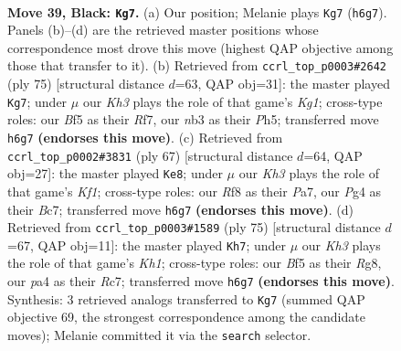 \documentclass[11pt]{article}
\begin{document}
\clearpage

\begin{figure}[p]\centering
\begin{subfigure}{0.46\textwidth}\centering
\resizebox{\linewidth}{!}{%
\newchessgame
\chessboard[
  setfen={5r2/4r3/1p5k/p1p1nb2/P5p1/1NP1R1P1/K6P/5BNR b - - 0 39},
  showmover=false,
  pgfstyle=straightmove, color=movearrow, markmove={h6-g7}
]}
\caption{}
\end{subfigure}\hfill
\begin{subfigure}{0.46\textwidth}\centering
\resizebox{\linewidth}{!}{%
\newchessgame
\chessboard[
  setfen={6k1/5r2/r1nR4/4p2p/4Pp2/5Pp1/2P3PP/2NR3K b - - 5 38},
  showmover=false,
  pgfstyle=straightmove, color=movearrow, markmove={g8-g7}
]}
\caption{}
\end{subfigure}
\\[4pt]
\begin{subfigure}{0.46\textwidth}\centering
\resizebox{\linewidth}{!}{%
\newchessgame
\chessboard[
  setfen={5k2/p1b2pp1/3r2p1/1p1nN3/3R3P/6P1/PP1B1P2/5K2 b - - 9 34},
  showmover=false,
  pgfstyle=straightmove, color=movearrow, markmove={f8-e8}
]}
\caption{}
\end{subfigure}\hfill
\begin{subfigure}{0.46\textwidth}\centering
\resizebox{\linewidth}{!}{%
\newchessgame
\chessboard[
  setfen={6rk/2r2pp1/3N1n1p/p4P2/Pp6/1P6/2PR3P/1K4R1 b - - 6 38},
  showmover=false,
  pgfstyle=straightmove, color=movearrow, markmove={h8-h7}
]}
\caption{}
\end{subfigure}
\caption{\textbf{Move 39, Black: \texttt{Kg7}.} (a) Our position; Melanie plays \texttt{Kg7} (\texttt{h6g7}). Panels (b)--(d) are the retrieved master positions whose correspondence most drove this move (highest QAP objective among those that transfer to it). (b) Retrieved from \texttt{ccrl\_top\_p0003\#2642} (ply 75) [structural distance $d$=63, QAP obj=31]: the master played \texttt{Kg7}; under $\mu$ our \emph{Kh3} plays the role of that game's \emph{Kg1}; cross-type roles: our \emph{B}f5 as their \emph{R}f7, our \emph{n}b3 as their \emph{P}h5; transferred move \texttt{h6g7} \textbf{(endorses this move)}. (c) Retrieved from \texttt{ccrl\_top\_p0002\#3831} (ply 67) [structural distance $d$=64, QAP obj=27]: the master played \texttt{Ke8}; under $\mu$ our \emph{Kh3} plays the role of that game's \emph{Kf1}; cross-type roles: our \emph{R}f8 as their \emph{P}a7, our \emph{P}g4 as their \emph{B}c7; transferred move \texttt{h6g7} \textbf{(endorses this move)}. (d) Retrieved from \texttt{ccrl\_top\_p0003\#1589} (ply 75) [structural distance $d$=67, QAP obj=11]: the master played \texttt{Kh7}; under $\mu$ our \emph{Kh3} plays the role of that game's \emph{Kh1}; cross-type roles: our \emph{B}f5 as their \emph{R}g8, our \emph{p}a4 as their \emph{R}c7; transferred move \texttt{h6g7} \textbf{(endorses this move)}. Synthesis: 3 retrieved analogs transferred to \texttt{Kg7} (summed QAP objective 69, the strongest correspondence among the candidate moves); Melanie committed it via the \texttt{search} selector.}
\label{fig:thought-m77}
\end{figure}
\end{document}
